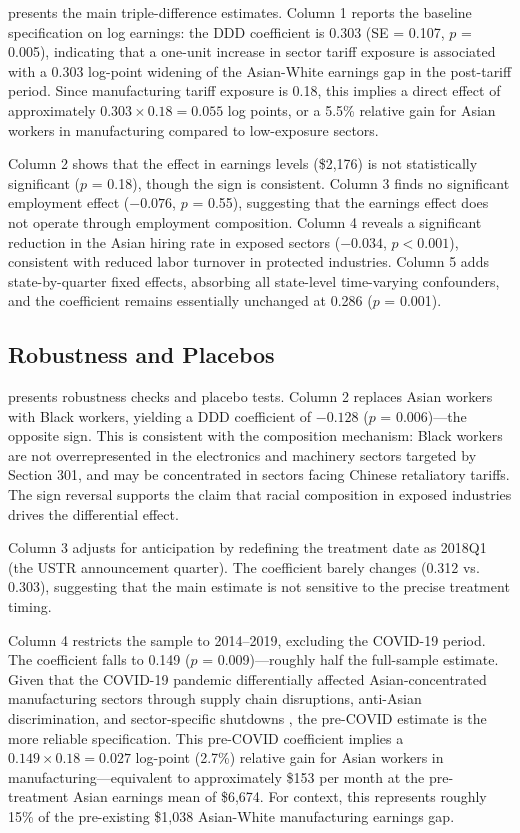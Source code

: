 \documentclass[12pt]{article}
\begin{document}


 presents the main triple-difference estimates. Column 1 reports the baseline specification on log earnings: the DDD coefficient is 0.303 (SE = 0.107, $p$ = 0.005), indicating that a one-unit increase in sector tariff exposure is associated with a 0.303 log-point widening of the Asian-White earnings gap in the post-tariff period. Since manufacturing tariff exposure is 0.18, this implies a direct effect of approximately $0.303 \times 0.18 = 0.055$ log points, or a 5.5\% relative gain for Asian workers in manufacturing compared to low-exposure sectors.

Column 2 shows that the effect in earnings levels (\$2,176) is not statistically significant ($p$ = 0.18), though the sign is consistent. Column 3 finds no significant employment effect ($-0.076$, $p$ = 0.55), suggesting that the earnings effect does not operate through employment composition. Column 4 reveals a significant reduction in the Asian hiring rate in exposed sectors ($-0.034$, $p < 0.001$), consistent with reduced labor turnover in protected industries. Column 5 adds state-by-quarter fixed effects, absorbing all state-level time-varying confounders, and the coefficient remains essentially unchanged at 0.286 ($p$ = 0.001).

\subsection{Robustness and Placebos}



 presents robustness checks and placebo tests. Column 2 replaces Asian workers with Black workers, yielding a DDD coefficient of $-0.128$ ($p$ = 0.006)---the opposite sign. This is consistent with the composition mechanism: Black workers are not overrepresented in the electronics and machinery sectors targeted by Section 301, and may be concentrated in sectors facing Chinese retaliatory tariffs. The sign reversal supports the claim that racial composition in exposed industries drives the differential effect.

Column 3 adjusts for anticipation by redefining the treatment date as 2018Q1 (the USTR announcement quarter). The coefficient barely changes (0.312 vs. 0.303), suggesting that the main estimate is not sensitive to the precise treatment timing.

Column 4 restricts the sample to 2014--2019, excluding the COVID-19 period. The coefficient falls to 0.149 ($p$ = 0.009)---roughly half the full-sample estimate. Given that the COVID-19 pandemic differentially affected Asian-concentrated manufacturing sectors through supply chain disruptions, anti-Asian discrimination, and sector-specific shutdowns \citep{kim2021effects}, the pre-COVID estimate is the more reliable specification. This pre-COVID coefficient implies a $0.149 \times 0.18 = 0.027$ log-point (2.7\%) relative gain for Asian workers in manufacturing---equivalent to approximately \$153 per month at the pre-treatment Asian earnings mean of \$6,674. For context, this represents roughly 15\% of the pre-existing \$1,038 Asian-White manufacturing earnings gap.
\end{document}
